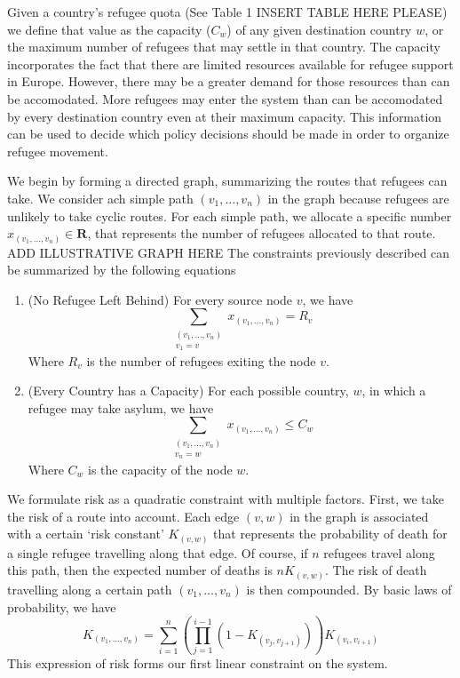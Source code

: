 \documentclass{article}
\begin{document}
Given a country's refugee quota (See Table 1 INSERT TABLE HERE PLEASE) we define that value as the capacity ($C_w$) of any given destination country $w$, or the maximum number of refugees that may settle in that country. The capacity incorporates the fact that there are limited resources available for refugee support in Europe. However, there may be a greater demand for those resources than can be accomodated. More refugees may enter the system than can be accomodated by every destination country even at their maximum capacity. This information can be used to decide which policy decisions should be made in order to organize refugee movement.

We begin by forming a directed graph, summarizing the routes that refugees can take. We consider ach simple path $(v_1, \dots, v_n)$ in the graph because refugees are unlikely to take cyclic routes. For each simple path, we allocate a specific number $x_{(v_1, \dots, v_n)} \in \mathbf{R}$, that represents the number of refugees allocated to that route. ADD ILLUSTRATIVE GRAPH HERE The constraints previously described can be summarized by the following equations

\begin{enumerate}
    \item (No Refugee Left Behind) For every source node $v$, we have
    \[ \sum_{\substack{(v_1, \dots, v_n) \\ v_1 = v}} x_{(v_1, \dots, v_n)} = R_v \]
    Where $R_v$ is the number of refugees exiting the node $v$.

    \item (Every Country has a Capacity) For each possible country, $w$, in which a refugee may take asylum, we have
    \[ \sum_{\substack{(v_1, \dots, v_n) \\ v_n = w}} x_{(v_1, \dots, v_n)} \leq C_w \]
    Where $C_w$ is the capacity of the node $w$.
\end{enumerate}

We formulate risk as a quadratic constraint with multiple factors. First, we take the risk of a route into account. Each edge $(v,w)$ in the graph is associated with a certain `risk constant' $K_{(v,w)}$ that represents the probability of death for a single refugee travelling along that edge. Of course, if $n$ refugees travel along this path, then the expected number of deaths is $n K_{(v,w)}$. The risk of death travelling along a certain path $(v_1, \dots, v_n)$ is then compounded. By basic laws of probability, we have
%
\[ K_{(v_1, \dots, v_n)} = \sum_{i = 1}^n \left( \prod_{j = 1}^{i-1} \left(1 - K_{(v_j,v_{j+1})} \right) \right) K_{(v_i, v_{i+1})} \]
%
This expression of risk forms our first linear constraint on the system.
\end{document}
